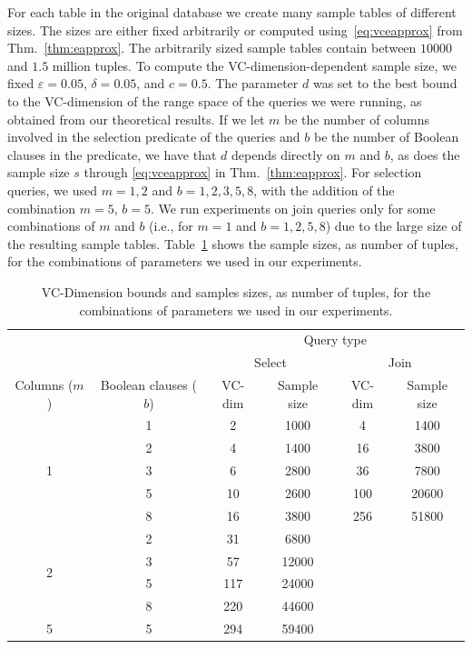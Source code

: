 For each table in the original database we create many sample tables of
different sizes. The sizes are either fixed arbitrarily or computed
using~\eqref{eq:vceapprox} from Thm.~\ref{thm:eapprox}. The arbitrarily sized
sample tables contain between $10000$ and $1.5$ million tuples. To compute the
VC-dimension-dependent sample size, we fixed $\varepsilon=0.05$,
$\delta=0.05$, and $c=0.5$. The parameter $d$ was set to the best bound to the
VC-dimension of the range space of the queries we were running, as obtained from
our theoretical results. If we let $m$ be the number of columns involved in the
selection predicate of the queries and $b$ be the number of Boolean clauses in
the predicate, we have that $d$ depends directly on $m$ and $b$, as does the
sample size $s$ through \eqref{eq:vceapprox} in Thm.~\ref{thm:eapprox}. For
selection queries, we used $m=1,2$ and $b=1,2,3,5,8$, with the addition of the
combination $m=5$, $b=5$. We run experiments on join queries only for some
combinations of $m$ and $b$ (i.e., for $m=1$ and $b=1,2,5,8$) due to the large
size of the resulting sample tables. Table~\ref{tab:samplesize} shows the sample
sizes, as number of tuples, for the combinations of parameters we used in our
experiments.

\begin{table}[htb]
  \centering
  \caption{VC-Dimension bounds and samples sizes, as number of tuples, for the
  combinations of parameters we used in our experiments. }
  \begin{tabular}{cccccc}
    \toprule
    & & \multicolumn{4}{c}{Query type} \\
    \cmidrule(l){3-6}
    & &
    \multicolumn{2}{c}{Select} &
    \multicolumn{2}{c}{Join} \\
    \cmidrule(l){3-4} \cmidrule(l){5-6} 
    Columns ($m$) & Boolean clauses ($b$) & VC-dim & Sample size & VC-dim & Sample size \\
    \midrule
    \multirow{5}{*}{1} & 1 & 2 & 1000 & 4 & 1400\\
     & 2 & 4 & 1400 & 16 & 3800\\
     & 3 & 6 & 2800 & 36 & 7800 \\
     & 5 & 10 & 2600 & 100 & 20600\\
     & 8 & 16 & 3800 & 256 & 51800\\
     \midrule
    \multirow{4}{*}{2} & 2 & 31 & 6800  & & \\
     & 3 & 57 & 12000 & & \\
     & 5 & 117 & 24000 & & \\
     & 8 & 220 & 44600 & & \\
     \midrule
    5 & 5 & 294 & 59400 & & \\
    \bottomrule
  \end{tabular}
  \label{tab:samplesize}
\end{table}
 
